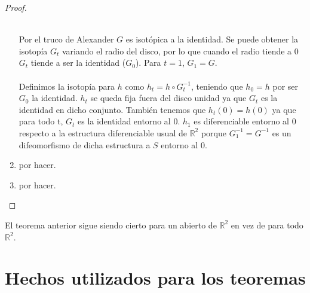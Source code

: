 \begin{proof}
\begin{enumerate}
				\\ Por el truco de Alexander $G$ es isotópica a la identidad. Se puede obtener la isotopía $G_t$ variando el radio del disco, por lo que cuando el radio tiende a 0 $G_t$ tiende a ser la identidad ($G_0$). Para $t=1$, $G_1=G$.\\
				\\ Definimos la isotopía para $h$ como $h_t=h\circ G_t^{-1}$, teniendo que $h_0=h$ por ser $G_0$ la identidad. $h_t$ se queda fija fuera del disco unidad ya que $G_t$ es la identidad en dicho conjunto. También tenemos que $h_t(0)=h(0)$ ya que para todo t, $G_t$ es la identidad entorno al $0$. $h_1$ es diferenciable entorno al $0$ respecto a la estructura diferenciable usual de $\mathbb{R}^2$ porque $G_1^{-1}=G^{-1}$ es un difeomorfismo de dicha estructura a $S$ entorno al $0$.
			\item por hacer.
			\item por hacer.
		\end{enumerate}
		
	\end{proof}
	\begin{corolario}
		El teorema anterior sigue siendo cierto para un abierto de $\mathbb{R}^2$ en vez de para todo $\mathbb{R}^2$.
	\end{corolario}


\section{Hechos utilizados para los teoremas}

\endinput
